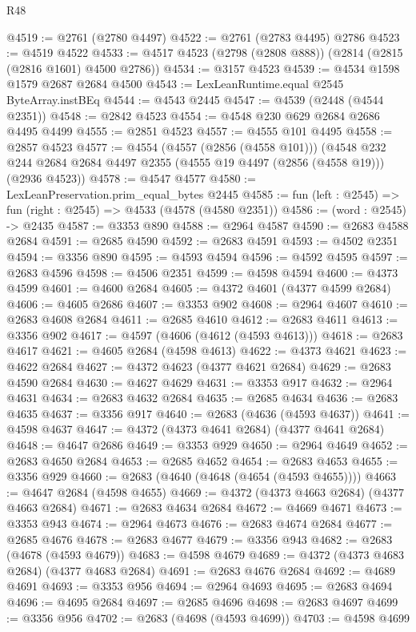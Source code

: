 \begin{lexlean}{R48}
\begin{coremodule}
@4519 := @2761 (@2780 @4497)
@4522 := @2761 (@2783 @4495) @2786
@4523 := @4519 @4522
@4533 := @4517 @4523 (@2798 (@2808 @888)) (@2814 (@2815 (@2816 @1601) @4500 @2786))
@4534 := @3157 @4523
@4539 := @4534 @1598 @1579 @2687 @2684 @4500
@4543 := LexLeanRuntime.equal @2545 ByteArray.instBEq
@4544 := @4543 @2445
@4547 := @4539 (@2448 (@4544 @2351))
@4548 := @2842 @4523
@4554 := @4548 @230 @629 @2684 @2686 @4495 @4499
@4555 := @2851 @4523
@4557 := @4555 @101 @4495
@4558 := @2857 @4523
@4577 := @4554
    (@4557 (@2856 (@4558 @101)))
    (@4548 @232 @244 @2684 @2684 @4497 @2355 (@4555 @19 @4497 (@2856 (@4558 @19))) (@2936 @4523))
@4578 := @4547 @4577
@4580 := LexLeanPreservation.prim_equal_bytes @2445
@4585 := fun (left : @2545) => fun (right : @2545) => @4533 (@4578 (@4580 @2351))
@4586 := (word : @2545) -> @2435
@4587 := @3353 @890
@4588 := @2964 @4587
@4590 := @2683 @4588 @2684
@4591 := @2685 @4590
@4592 := @2683 @4591
@4593 := @4502 @2351
@4594 := @3356 @890
@4595 := @4593 @4594
@4596 := @4592 @4595
@4597 := @2683 @4596
@4598 := @4506 @2351
@4599 := @4598 @4594
@4600 := @4373 @4599
@4601 := @4600 @2684
@4605 := @4372 @4601 (@4377 @4599 @2684)
@4606 := @4605 @2686
@4607 := @3353 @902
@4608 := @2964 @4607
@4610 := @2683 @4608 @2684
@4611 := @2685 @4610
@4612 := @2683 @4611
@4613 := @3356 @902
@4617 := @4597 (@4606 (@4612 (@4593 @4613)))
@4618 := @2683 @4617
@4621 := @4605 @2684 (@4598 @4613)
@4622 := @4373 @4621
@4623 := @4622 @2684
@4627 := @4372 @4623 (@4377 @4621 @2684)
@4629 := @2683 @4590 @2684
@4630 := @4627 @4629
@4631 := @3353 @917
@4632 := @2964 @4631
@4634 := @2683 @4632 @2684
@4635 := @2685 @4634
@4636 := @2683 @4635
@4637 := @3356 @917
@4640 := @2683 (@4636 (@4593 @4637))
@4641 := @4598 @4637
@4647 := @4372 (@4373 @4641 @2684) (@4377 @4641 @2684)
@4648 := @4647 @2686
@4649 := @3353 @929
@4650 := @2964 @4649
@4652 := @2683 @4650 @2684
@4653 := @2685 @4652
@4654 := @2683 @4653
@4655 := @3356 @929
@4660 := @2683 (@4640 (@4648 (@4654 (@4593 @4655))))
@4663 := @4647 @2684 (@4598 @4655)
@4669 := @4372 (@4373 @4663 @2684) (@4377 @4663 @2684)
@4671 := @2683 @4634 @2684
@4672 := @4669 @4671
@4673 := @3353 @943
@4674 := @2964 @4673
@4676 := @2683 @4674 @2684
@4677 := @2685 @4676
@4678 := @2683 @4677
@4679 := @3356 @943
@4682 := @2683 (@4678 (@4593 @4679))
@4683 := @4598 @4679
@4689 := @4372 (@4373 @4683 @2684) (@4377 @4683 @2684)
@4691 := @2683 @4676 @2684
@4692 := @4689 @4691
@4693 := @3353 @956
@4694 := @2964 @4693
@4695 := @2683 @4694
@4696 := @4695 @2684
@4697 := @2685 @4696
@4698 := @2683 @4697
@4699 := @3356 @956
@4702 := @2683 (@4698 (@4593 @4699))
@4703 := @4598 @4699

\end{coremodule}
\end{lexlean}
